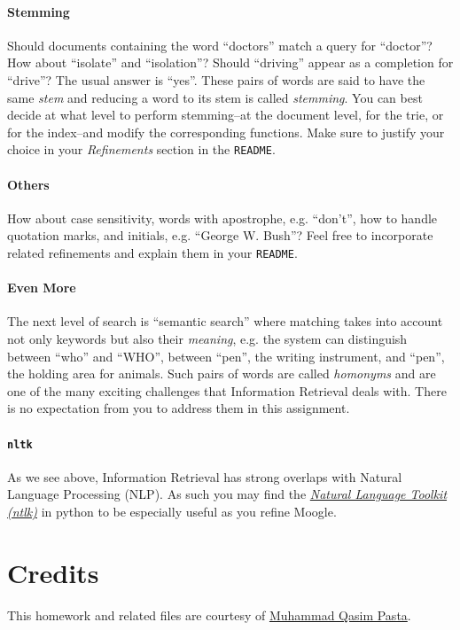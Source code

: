 \documentclass[addpoints]{exam}
\begin{document}
\paragraph{Stemming} Should documents containing the word ``doctors'' match a query for ``doctor''? How about ``isolate'' and ``isolation''? Should ``driving'' appear as a completion for ``drive''? The usual answer is ``yes''. These pairs of words are said to have the same \textit{stem} and reducing a word to its stem is called \textit{stemming}. You can best decide at what level to perform stemming--at the document level, for the trie, or for the index--and modify the corresponding functions. Make sure to justify your choice in your \textit{Refinements} section in the \texttt{README}.

\paragraph{Others} How about case sensitivity, words with apostrophe, e.g. ``don't'', how to handle quotation marks, and initials, e.g. ``George W. Bush''? Feel free to incorporate related refinements and explain them in your \texttt{README}.

\paragraph{Even More} The next level of search is ``semantic search'' where matching takes into account not only keywords but also their \textit{meaning}, e.g. the system can distinguish between ``who'' and ``WHO'', between ``pen'', the writing instrument, and ``pen'', the holding area for animals. Such pairs of words are called \textit{homonyms} and are one of the many exciting challenges that Information Retrieval deals with. There is no expectation from you to address them in this assignment.

\paragraph{\texttt{nltk}} As we see above, Information Retrieval has strong overlaps with Natural Language Processing (NLP). As such you may find the \href{https://www.nltk.org}{\textit{Natural Language Toolkit (ntlk)}} in python to be especially useful as you refine Moogle.


\section*{Credits}

This homework and related files are courtesy of \href{http://qasimpasta.info}{Muhammad Qasim Pasta}.
\end{document}
